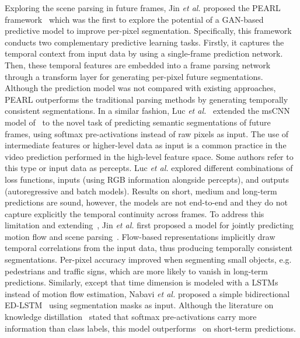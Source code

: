 Exploring the scene parsing in future frames, Jin \textit{et al.} proposed the \ac{PEARL} framework~\cite{Jin2017} which was the first to explore the potential of a \ac{GAN}-based predictive model to improve per-pixel segmentation. Specifically, this framework conducts two complementary predictive learning tasks. Firstly, it captures the temporal context from input data by using a single-frame prediction network. Then, these temporal features are embedded into a frame parsing network through a transform layer for generating per-pixel future segmentations. Although the prediction model was not compared with existing approaches, \ac{PEARL} outperforms the traditional parsing methods by generating temporally consistent segmentations. In a similar fashion, Luc \textit{et al.}~\cite{Luc2017} extended the ms\ac{CNN} model of~\cite{Mathieu2016} to the novel task of predicting semantic segmentations of future frames, using softmax pre-activations instead of raw pixels as input. The use of intermediate features or higher-level data as input is a common practice in the video prediction performed in the high-level feature space. Some authors refer to this type or input data as percepts. Luc \textit{et al.} explored different combinations of loss functions, inputs (using RGB information alongside percepts), and outputs (autoregressive and batch models). Results on short, medium and long-term predictions are sound, however, the models are not end-to-end and they do not capture explicitly the temporal continuity across frames. To address this limitation and extending~\cite{Jin2017}, Jin \textit{et al.} first proposed a model for jointly predicting motion flow and scene parsing~\cite{Jin2017a}. Flow-based representations implicitly draw temporal correlations from the input data, thus producing temporally consistent segmentations. Per-pixel accuracy improved when segmenting small objects, e.g. pedestrians and traffic signs, which are more likely to vanish in long-term predictions. Similarly, except that time dimension is modeled with a \acp{LSTM} instead of motion flow estimation, Nabavi \textit{et al.} proposed a simple bidirectional \ac{ED}-\ac{LSTM}~\cite{Nabavi2018} using segmentation masks as input. Although the literature on knowledge distillation~\cite{Ba2014,Hinton2015} stated that softmax pre-activations carry more information than class labels, this model outperforms~\cite{Jin2017a,Luc2017} on short-term predictions.

